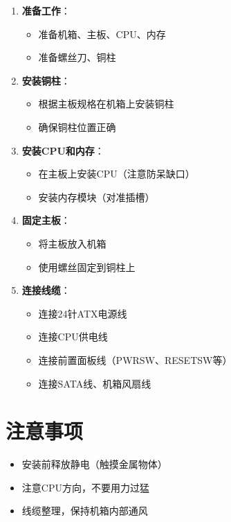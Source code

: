 \documentclass[12pt,UTF8]{ctexbook}
\begin{document}
\begin{enumerate}
    \item \textbf{准备工作}：
    \begin{itemize}[leftmargin=2em]
        \item 准备机箱、主板、CPU、内存
        \item 准备螺丝刀、铜柱
    \end{itemize}
    
    \item \textbf{安装铜柱}：
    \begin{itemize}[leftmargin=2em]
        \item 根据主板规格在机箱上安装铜柱
        \item 确保铜柱位置正确
    \end{itemize}
    
    \item \textbf{安装CPU和内存}：
    \begin{itemize}[leftmargin=2em]
        \item 在主板上安装CPU（注意防呆缺口）
        \item 安装内存模块（对准插槽）
    \end{itemize}
    
    \item \textbf{固定主板}：
    \begin{itemize}[leftmargin=2em]
        \item 将主板放入机箱
        \item 使用螺丝固定到铜柱上
    \end{itemize}
    
    \item \textbf{连接线缆}：
    \begin{itemize}[leftmargin=2em]
        \item 连接24针ATX电源线
        \item 连接CPU供电线
        \item 连接前置面板线（PWR\textunderscore SW、RESET\textunderscore SW等）
        \item 连接SATA线、机箱风扇线
    \end{itemize}
\end{enumerate}

\section{注意事项}

\begin{itemize}[leftmargin=2em]
    \item 安装前释放静电（触摸金属物体）
    \item 注意CPU方向，不要用力过猛
    \item 线缆整理，保持机箱内部通风
\end{itemize}
\end{document}
